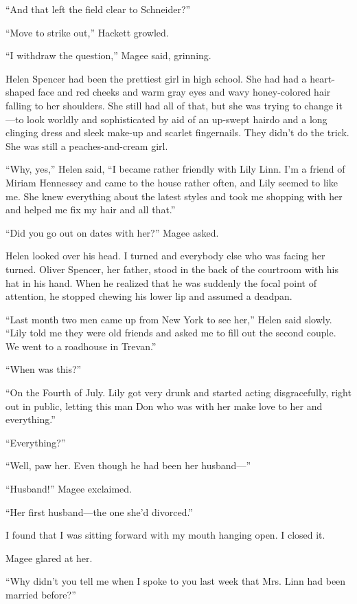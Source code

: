 \documentclass{novel}
\begin{document}
“And that left the field clear to Schneider?”

“Move to strike out,” Hackett growled.

“I withdraw the question,” Magee said, grinning.

\scenestars

Helen Spencer had been the prettiest girl in high school. She had had a heart-shaped face and red cheeks and warm gray eyes and wavy honey-colored hair falling to her shoulders. She still had all of that, but she was trying to change it—to look worldly and sophisticated by aid of an up-swept hairdo and a long clinging dress and sleek make-up and scarlet fingernails. They didn’t do the trick. She was still a peaches-and-cream girl.

“Why, yes,” Helen said, “I became rather friendly with Lily Linn. I’m a friend of Miriam Hennessey and came to the house rather often, and Lily seemed to like me. She knew everything about the latest styles and took me shopping with her and helped me fix my hair and all that.”

“Did you go out on dates with her?” Magee asked.

Helen looked over his head. 
I turned and everybody else who was facing her turned. Oliver Spencer, her father, stood in the back of the courtroom with his hat in his hand. When he realized that he was suddenly the focal point of attention, he stopped chewing his lower lip and assumed a deadpan.

“Last month two men came up from New York to see her,” Helen said slowly. “Lily told me they were old friends and asked me to fill out the second couple. We went to a roadhouse in Trevan.”

“When was this?”

“On the Fourth of July. Lily got very drunk and started acting disgracefully, right out in public, letting this man Don who was with her make love to her and everything.”

“Everything?”

“Well, paw her. Even though he had been her husband—”

“Husband!” Magee exclaimed.

“Her first husband—the one she’d divorced.”

I found that I was sitting forward with my mouth hanging open. I closed it.

Magee glared at her. 

“Why didn’t you tell me when I spoke to you last week that Mrs. Linn had been married before?”
\end{document}
